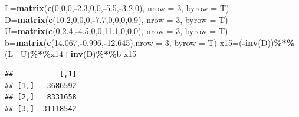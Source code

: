 \documentclass[
]{article}
\newenvironment{Shaded}{\begin{snugshade}}{\end{snugshade}}
\newcommand{\AttributeTok}[1]{\textcolor[rgb]{0.13,0.29,0.53}{#1}}
\newcommand{\DecValTok}[1]{\textcolor[rgb]{0.00,0.00,0.81}{#1}}
\newcommand{\FloatTok}[1]{\textcolor[rgb]{0.00,0.00,0.81}{#1}}
\newcommand{\FunctionTok}[1]{\textcolor[rgb]{0.13,0.29,0.53}{\textbf{#1}}}
\newcommand{\NormalTok}[1]{#1}
\newcommand{\OtherTok}[1]{\textcolor[rgb]{0.56,0.35,0.01}{#1}}
\newcommand{\SpecialCharTok}[1]{\textcolor[rgb]{0.81,0.36,0.00}{\textbf{#1}}}
\begin{document}
\begin{Shaded}
\begin{Highlighting}[]
\NormalTok{  L}\OtherTok{=}\FunctionTok{matrix}\NormalTok{(}\FunctionTok{c}\NormalTok{(}\DecValTok{0}\NormalTok{,}\DecValTok{0}\NormalTok{,}\DecValTok{0}\NormalTok{,}\SpecialCharTok{{-}}\FloatTok{2.3}\NormalTok{,}\DecValTok{0}\NormalTok{,}\DecValTok{0}\NormalTok{,}\SpecialCharTok{{-}}\FloatTok{5.5}\NormalTok{,}\SpecialCharTok{{-}}\FloatTok{3.2}\NormalTok{,}\DecValTok{0}\NormalTok{), }\AttributeTok{nrow =} \DecValTok{3}\NormalTok{, }\AttributeTok{byrow =}\NormalTok{ T)}
\NormalTok{  D}\OtherTok{=}\FunctionTok{matrix}\NormalTok{(}\FunctionTok{c}\NormalTok{(}\FloatTok{10.2}\NormalTok{,}\DecValTok{0}\NormalTok{,}\DecValTok{0}\NormalTok{,}\DecValTok{0}\NormalTok{,}\SpecialCharTok{{-}}\FloatTok{7.7}\NormalTok{,}\DecValTok{0}\NormalTok{,}\DecValTok{0}\NormalTok{,}\DecValTok{0}\NormalTok{,}\FloatTok{0.9}\NormalTok{), }\AttributeTok{nrow =} \DecValTok{3}\NormalTok{, }\AttributeTok{byrow =}\NormalTok{ T)}
\NormalTok{  U}\OtherTok{=}\FunctionTok{matrix}\NormalTok{(}\FunctionTok{c}\NormalTok{(}\DecValTok{0}\NormalTok{,}\FloatTok{2.4}\NormalTok{,}\SpecialCharTok{{-}}\FloatTok{4.5}\NormalTok{,}\DecValTok{0}\NormalTok{,}\DecValTok{0}\NormalTok{,}\FloatTok{11.1}\NormalTok{,}\DecValTok{0}\NormalTok{,}\DecValTok{0}\NormalTok{,}\DecValTok{0}\NormalTok{), }\AttributeTok{nrow =} \DecValTok{3}\NormalTok{, }\AttributeTok{byrow =}\NormalTok{ T)}
\NormalTok{  b}\OtherTok{=}\FunctionTok{matrix}\NormalTok{(}\FunctionTok{c}\NormalTok{(}\FloatTok{14.067}\NormalTok{,}\SpecialCharTok{{-}}\FloatTok{0.996}\NormalTok{,}\SpecialCharTok{{-}}\FloatTok{12.645}\NormalTok{),}\AttributeTok{nrow =} \DecValTok{3}\NormalTok{, }\AttributeTok{byrow =}\NormalTok{ T)}
\NormalTok{  x15}\OtherTok{=}\NormalTok{(}\SpecialCharTok{{-}}\FunctionTok{inv}\NormalTok{(D))}\SpecialCharTok{\%*\%}\NormalTok{(L}\SpecialCharTok{+}\NormalTok{U)}\SpecialCharTok{\%*\%}\NormalTok{x14}\SpecialCharTok{+}\FunctionTok{inv}\NormalTok{(D)}\SpecialCharTok{\%*\%}\NormalTok{b}
\NormalTok{  x15}
\end{Highlighting}
\end{Shaded}

\begin{verbatim}
##           [,1]
## [1,]   3686592
## [2,]   8331658
## [3,] -31118542
\end{verbatim}
\end{document}
